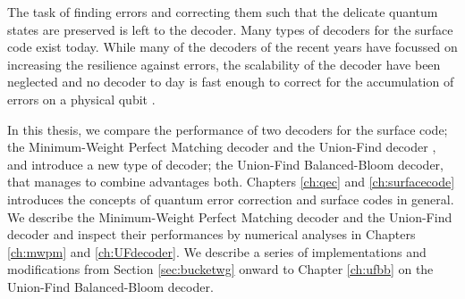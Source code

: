 The task of finding errors and correcting them such that the delicate quantum states are preserved is left to the decoder. Many types of decoders for the surface code exist today. While many of the decoders of the recent years have focussed on increasing the resilience against errors, the scalability of the decoder have been neglected and no decoder to day is fast enough to correct for the accumulation of errors on a physical qubit \cite{anwar2014fast, duclos2010fast, herold2015cellular, hutter2014efficient, watson2015fast, wootton2012high, bravyi2014efficient, heim2016optimal}.

In this thesis, we compare the performance of two decoders for the surface code; the Minimum-Weight Perfect Matching decoder and the Union-Find decoder \cite{delfosse2017almost}, and introduce a new type of decoder; the Union-Find Balanced-Bloom decoder, that manages to combine advantages both. Chapters \ref{ch:qec} and \ref{ch:surfacecode} introduces the concepts of quantum error correction and surface codes in general. We describe the Minimum-Weight Perfect Matching decoder and the Union-Find decoder and inspect their performances by numerical analyses in Chapters \ref{ch:mwpm} and \ref{ch:UFdecoder}. We describe a series of implementations and modifications from Section \ref{sec:bucketwg} onward to Chapter \ref{ch:ufbb} on the Union-Find Balanced-Bloom decoder. 
